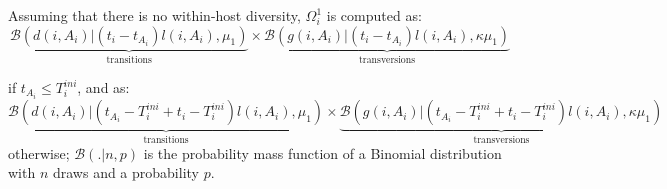 \documentclass[10pt]{article}
\begin{document}
Assuming that there is no within-host diversity, $\Omega_i^1$ is computed as: 
\begin{equation}
\underbrace{\mathcal{B}\left(d(i,A_i) | (t_i - t_{A_i}) l(i,A_i), \mu_1 \right)}_{\mbox{transitions}}
\times 
\underbrace{\mathcal{B}\left(g(i,A_i) | (t_i - t_{A_i}) l(i,A_i), \kappa \mu_1 \right)}_{\mbox{transversions}}
\end{equation}

if $t_{A_i} \leq T_i^{ini} $, and as:
\begin{equation}
\underbrace{\mathcal{B}\left(d(i,A_i) | (t_{A_i} - T_i^{ini} + t_i - T_i^{ini}) l(i,A_i), \mu_1 \right)}_{\mbox{transitions}}
\times 
\underbrace{\mathcal{B}\left(g(i,A_i) | (t_{A_i} - T_i^{ini} + t_i - T_i^{ini}) l(i,A_i), \kappa \mu_1 \right)}_{\mbox{transversions}}
\end{equation}
otherwise; $\mathcal{B}(. | n, p)$ is the probability mass function of a Binomial distribution with $n$ draws and a probability $p$.
~\\

% 
~\\
\end{document}
